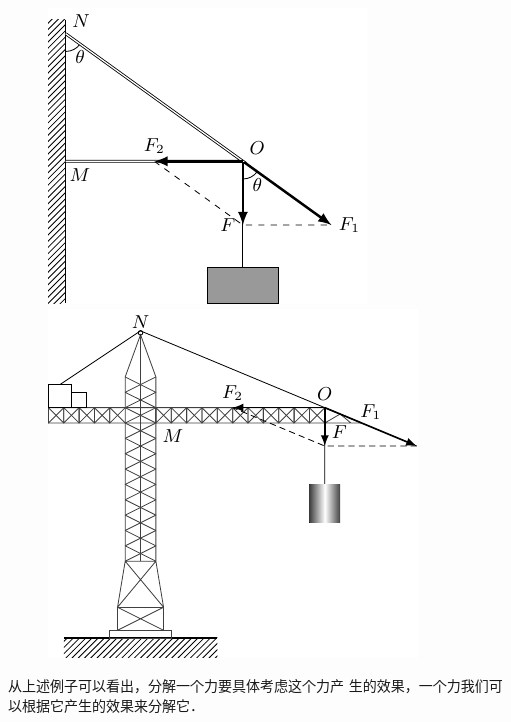 \begin{figure} [htp]
\centering
\begin{minipage} [t]{0.48\textwidth} 
\centering
\includegraphics{fig/A/1-30.pdf} 
\caption{} \label{fig_A_1-30} 
\end{minipage} 
\begin{minipage} [t]{0.48\textwidth} 
\centering
\includegraphics{fig/A/1-31.pdf} 
\caption{} \label{fig_A_1-31} 
\end{minipage} 
\end{figure} 

    从上述例子可以看出，分解一个力要具体考虑这个力产
生的效果，一个力我们可以根据它产生的效果来分解它．


